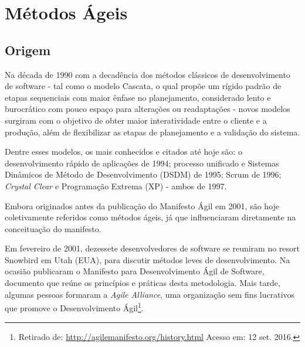 \chapter{Métodos Ágeis}
\label{cap:metodosageis}
\section{Origem}
\par  Na década de 1990 com a decadência dos métodos clássicos de desenvolvimento de software - tal como o modelo Cascata, o qual propõe um rígido padrão de etapas sequenciais com maior ênfase no planejamento, considerado lento e burocrático com pouco espaço para alterações ou readaptações - novos modelos surgiram com o objetivo de obter maior interatividade entre o cliente e a produção, além de flexibilizar as etapas de planejamento e a validação do sistema.
\par Dentre esses modelos, os mais conhecidos e citados até hoje são: o desenvolvimento rápido de aplicações de 1994; processo unificado e Sistemas Dinâmicos de Método de Desenvolvimento (DSDM) de 1995; Scrum de 1996; \emph{Crystal Clear} e Programação Extrema (XP) - ambos de 1997.
\par Embora originados antes da publicação do Manifesto Ágil em 2001, são hoje coletivamente referidos como métodos ágeis, já que influenciaram diretamente na conceituação do manifesto.
\par Em fevereiro de 2001, dezessete desenvolvedores de software se reuniram no resort Snowbird em Utah (EUA), para discutir métodos leves de desenvolvimento. Na ocasião publicaram o Manifesto para Desenvolvimento Ágil de Software, documento que reúne os princípios e práticas desta metodologia. Mais tarde, algumas pessoas formaram a \emph{Agile Alliance}, uma organização sem fins lucrativos que promove o Desenvolvimento Ágil\footnote{Retirado de: \url{http://agilemanifesto.org/history.html} Acesso em: 12 set. 2016.}.
